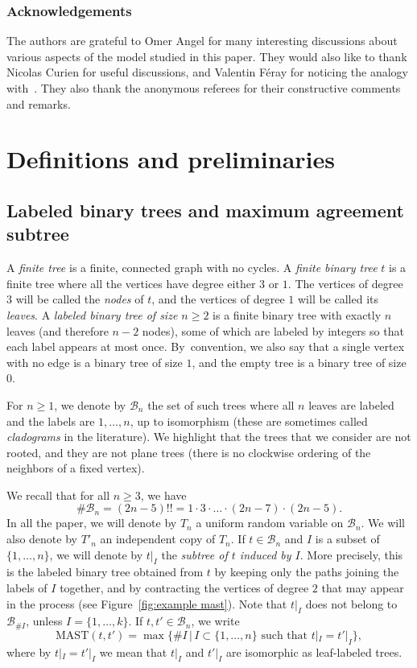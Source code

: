 \documentclass[JEP,XML,SOM,Unicode,NoFloatCountersInSection,published]{cedram}
\newcommand{\MAST}{\mathrm{MAST}}
\newcommand{\Bb}{\mathcal{B}}
\theoremstyle{plain}
\theoremstyle{definition}
\begin{document}
\subsubsection*{Acknowledgements} The authors are grateful to Omer Angel
for many interesting discussions about various aspects of the model studied in this paper. They would also like to thank Nicolas Curien for useful discussions, and Valentin Féray for noticing the analogy with~\cite{BBDFGMP22, borga_power_2023}.
They also thank the anonymous referees for their constructive comments and remarks.

\section{Definitions and preliminaries}\label{sec:definitions and preliminaries}

\subsection{Labeled binary trees and maximum agreement subtree}\label{subsec_discrete_defns}

A \emph{finite tree} is a finite, connected graph with no cycles.
A \emph{finite binary tree} $t$ is a finite tree where all the vertices have degree either $3$ or $1$.
The vertices of degree $3$ will be called the \emph{nodes} of $t$, and the vertices of degree $1$ will be called its \emph{leaves}.
A \emph{labeled binary tree of size $n \geq 2$} is a finite binary tree with exactly $n$ leaves (and therefore $n-2$ nodes), some of which are labeled by integers so that each label appears at most once. By~convention, we also say that a single vertex with no edge is a binary tree of size $1$, and the empty tree is a binary tree of size $0$.

For $n \geq 1$, we denote by $\Bb_n$ the set of such trees where all $n$ leaves are labeled and the labels are $1, \dots, n$, up to isomorphism (these are sometimes called \emph{cladograms} in the literature).
We highlight that the trees that we consider are not rooted, and they are not plane trees (\ie there is no clockwise ordering of the neighbors of a fixed vertex).

We recall that for all $n \geq 3$, we have\vspace*{-3pt}
\[ \# \Bb_n = (2n-5)!!=1 \cdot 3 \cdot \dots \cdot (2n-7) \cdot (2n-5). \]
In all the paper, we will denote by $T_n$ a uniform random variable on $\Bb_n$.
We will also denote by $T'_n$ an independent copy of $T_n$. If $t \in \Bb_n$ and $I$ is a subset of $\{1,\dots,n\}$, we will denote by $t|_I$ the \emph{subtree of $t$ induced by $I$}.
More precisely, this is the labeled binary tree obtained from $t$ by keeping only the paths joining the labels of $I$ together, and by contracting the vertices of degree $2$ that may appear in the process (see Figure~\ref{fig:example mast}). Note that $t|_I$ does not belong to $\Bb_{\#I}$, unless $I=\{1,\dots,k\}$. If $t,t' \in \Bb_n$, we write\vspace*{-3pt}\enlargethispage{.5\baselineskip}
\[ \MAST(t,t')=\max \bigl\{ \#I \, \big|\, I \subset \{1,\dots,n\} \mbox{ such that } t|_I=t'|_I \bigr\},\]
where by $t|_I=t'|_I$ we mean that $t|_I$ and $t'|_I$ are isomorphic as leaf-labeled trees.
\end{document}
